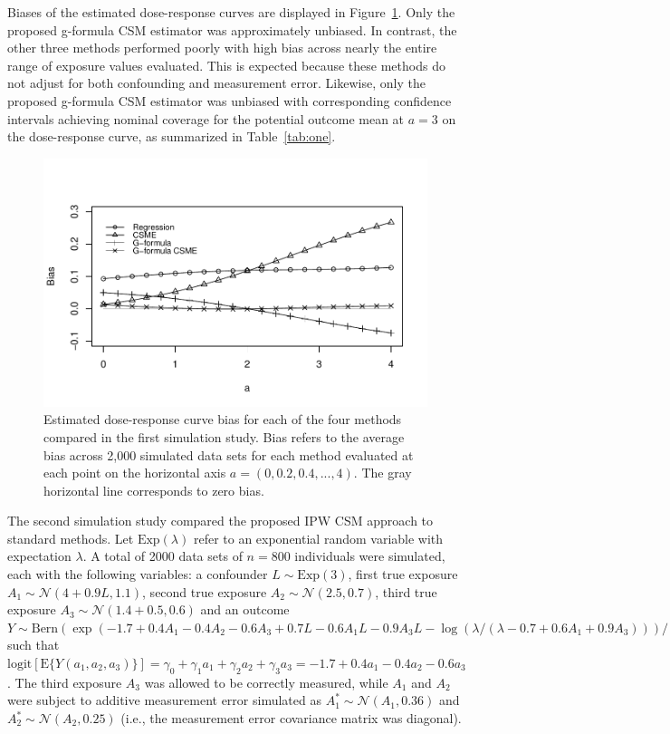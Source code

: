 \documentclass[useAMS,usenatbib,referee]{biom}
\begin{document}
Biases of the estimated dose-response curves are displayed in Figure~\ref{fig:two}. Only the proposed g-formula CSM estimator was approximately unbiased. In contrast, the other three methods performed poorly with high bias across nearly the entire range of exposure values evaluated. This is expected because these methods do not adjust for both confounding and measurement error. Likewise, only the proposed g-formula CSM estimator was unbiased with corresponding confidence intervals achieving nominal coverage for the potential outcome mean at $a = 3$ on the dose-response curve, as summarized in Table~\ref{tab:one}.

\begin{figure}
\centering
\includegraphics[width=6in]{paper1-fig2-grey.pdf}
\caption{Estimated dose-response curve bias for each of the four methods compared in the first simulation study. Bias refers to the average bias across 2,000 simulated data sets for each method evaluated at each point on the horizontal axis $a = (0, 0.2, 0.4, ..., 4)$. The gray horizontal line corresponds to zero bias.}
\label{fig:two}
\end{figure}

The second simulation study compared the proposed IPW CSM approach to standard methods. Let $\text{Exp}(\lambda)$ refer to an exponential random variable with expectation $\lambda$. A total of 2000 data sets of $n = 800$ individuals were simulated, each with the following variables: a confounder $L \sim \text{Exp}(3)$, first true exposure $A_{1} \sim \mathcal{N}(4 + 0.9L, 1.1)$, second true exposure $A_{2} \sim \mathcal{N}(2.5, 0.7)$, third true exposure $A_{3} \sim \mathcal{N}(1.4 + 0.5, 0.6)$ and an outcome $Y \sim \text{Bern}(\exp(-1.7 + 0.4A_{1} - 0.4A_{2} - 0.6A_{3} + 0.7L - 0.6A_{1}L - 0.9A_{3}L - \log(\lambda / (\lambda - 0.7 + 0.6A_{1} + 0.9A_{3}))) / (1 + \exp(-1.7 + 0.4A_{1} - 0.4A_{2} - 0.6A_{3})))$ such that $\text{logit}[\text{E}\{ Y(a_{1}, a_{2}, a_{3})\} ] = \gamma_{0} + \gamma_{1}a_{1} + \gamma_{2}a_{2} + \gamma_{3}a_{3} = -1.7 + 0.4a_{1} - 0.4a_{2} - 0.6a_{3}$. The third exposure $A_{3}$ was allowed to be correctly measured, while $A_{1}$ and $A_{2}$ were subject to additive measurement error simulated as $A_{1}^{*} \sim \mathcal{N}(A_{1}, 0.36)$ and $A_{2}^{*} \sim \mathcal{N}(A_{2}, 0.25)$ (i.e., the measurement error covariance matrix was diagonal).
\end{document}
